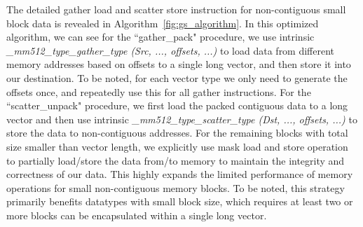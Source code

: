 \documentclass[conference]{IEEEtran}
\begin{document}
The detailed gather load and scatter store instruction for non-contiguous
small block data is revealed in Algorithm~\ref{fig:gs_algorithm}.
In this optimized algorithm, we can see for the ``gather\_pack" procedure, we use
intrinsic \emph{\textit{\_mm512\_type\_gather\_type (Src, ..., offsets, ...)}} to load data from
different memory addresses based on offsets to a single long vector, and then store it into our destination.
To be noted, for each vector type we only need to generate the offsets once, and repeatedly use this for all gather instructions.
For the ``scatter\_unpack" procedure, we first load the packed contiguous data to a long vector and then use intrinsic
\emph{\textit{\_mm512\_type\_scatter\_type (Dst, ..., offsets, ...)}} to store the data to non-contiguous addresses.
For the remaining blocks with total size smaller than vector length, we explicitly use mask load and store operation to partially load/store the data from/to memory to maintain the integrity and correctness of our data.
This highly expands the limited performance of memory operations for small non-contiguous memory blocks. To be noted,
this strategy primarily benefits datatypes with small block size, which requires at least two or more blocks can be encapsulated
within a single long vector.
\end{document}
